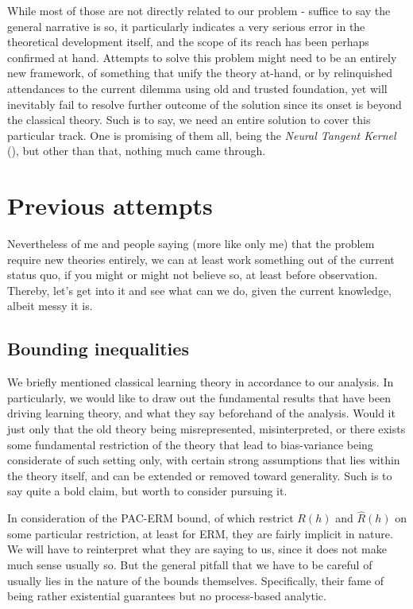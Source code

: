While most of those are not directly related to our problem - suffice to say the general narrative is so, it particularly indicates a very serious error in the theoretical development itself, and the scope of its reach has been perhaps confirmed at hand. Attempts to solve this problem might need to be an entirely new framework, of something that unify the theory at-hand, or by relinquished attendances to the current dilemma using old and trusted foundation, yet will inevitably fail to resolve further outcome of the solution since its onset is beyond the classical theory. Such is to say, we need an entire solution to cover this particular track. One is promising of them all, being the \textit{Neural Tangent Kernel} (\cite{Jacot:2018:NTK}), but other than that, nothing much came through. 

\section{Previous attempts}

Nevertheless of me and people saying (more like only me) that the problem require new theories entirely, we can at least work something out of the current status quo, if you might or might not believe so, at least before observation. Thereby, let's get into it and see what can we do, given the current knowledge, albeit messy it is. 


\subsection{Bounding inequalities}

We briefly mentioned classical learning theory in accordance to our analysis. In particularly, we would like to draw out the fundamental results that have been driving learning theory, and what they say beforehand of the analysis. Would it just only that the old theory being misrepresented, misinterpreted, or there exists some fundamental restriction of the theory that lead to bias-variance being considerate of such setting only, with certain strong assumptions that lies within the theory itself, and can be extended or removed toward generality. Such is to say quite a bold claim, but worth to consider pursuing it. 

In consideration of the PAC-ERM bound, of which restrict $R(h)$ and $\hat{R}(h)$ on some particular restriction, at least for ERM, they are fairly implicit in nature. We will have to reinterpret what they are saying to us, since it does not make much sense usually so. But the general pitfall that we have to be careful of usually lies in the nature of the bounds themselves. Specifically, their fame of being rather existential guarantees but no process-based analytic. 

